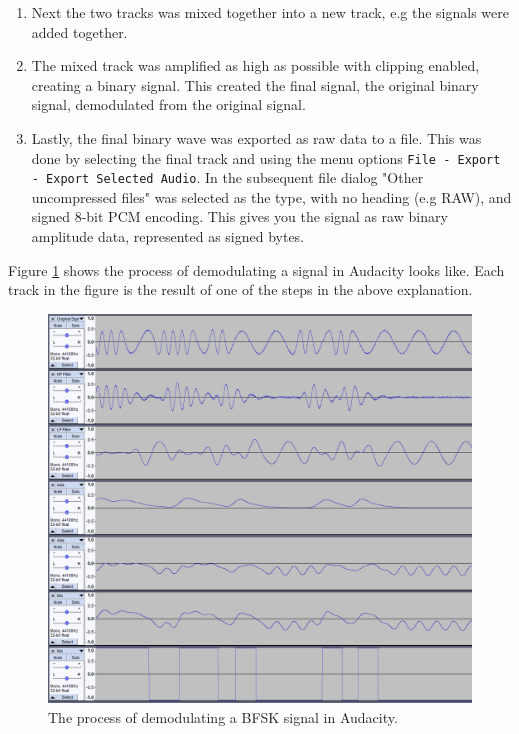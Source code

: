 \begin{enumerate}
    \item Next the two tracks was mixed together into a new track, e.g the signals were added together.

    \item The mixed track was amplified as high as possible with clipping enabled, creating a binary signal. This created the final signal, the original binary signal, demodulated from the original signal.
    
    \item Lastly, the final binary wave was exported as raw data to a file. This was done by selecting the final track and using the menu options \texttt{File - Export - Export Selected Audio}. In the subsequent file dialog "Other uncompressed files" was selected as the type, with no heading (e.g RAW), and signed 8-bit PCM encoding. This gives you the signal as raw binary amplitude data, represented as signed bytes.
\end{enumerate}
Figure \ref{fig:audacity-demodulation} shows the process of demodulating a signal in Audacity looks like. Each track in the figure is the result of one of the steps in the above explanation.
\begin{figure}[!ht]
    \centering
    \includegraphics[width=\textwidth]{images/6-pentesting/audacity-demodulation.png}
    \caption{The process of demodulating a BFSK signal in Audacity.}
    \label{fig:audacity-demodulation}
\end{figure}
